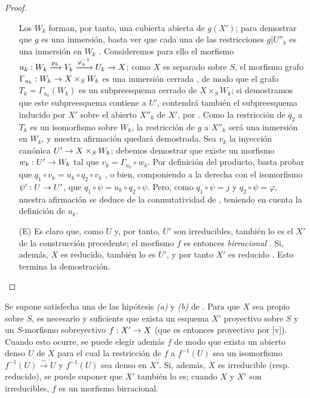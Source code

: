 \documentclass[oneside,10pt]{amsart}
\makeatletter
\newcommand{\ega@arrow}[2]{\mathchoice{#1}{#2}{#2}{#2}}
\renewcommand{\to}{\ega@arrow{\longrightarrow}{\rightarrow}}
\newcommand{\oldpage}[2][]{\marginnote{\normalfont\footnotesize\textbf{#1}~|~#2}\ignorespaces}
\let\EGAOriginalLabel\label
\renewcommand{\label}[1]{\phantomsection\EGAOriginalLabel{#1}}
\makeatother
\begin{document}
\begin{proof}
\begin{enumerate}
    Los $W_k$ forman, por tanto, una cubierta abierta de $g(X')$; para demostrar que $g$ es una inmersión, basta ver que cada una de las restricciones $g|U''_k$ es una inmersión en $W_k$ .
    Consideremos para ello el morfismo $u_k:W_k\xrightarrow{p_k}V_k\xrightarrow{\varphi_k^{-1}}U_k\to X$; como $X$ es separado sobre $S$, el morfismo grafo $\Gamma_{u_k}:W_k\to X\times_SW_k$ es una inmersión cerrada , de modo que el grafo $T_k=\Gamma_{u_k}(W_k)$ es un subpreesquema cerrado de $X\times_SW_k$;
    si demostramos que este subpreesquema contiene a $U'$, contendrá también el subpreesquema inducido por $X'$ sobre el abierto $X''_k$ de $X'$, por .
    Como la restricción de $q_2$ a $T_k$ es un isomorfismo sobre $W_k$, la restricción de $g$ a $X''_k$ será una inmersión en $W_k$, y nuestra afirmación quedará demostrada.
    Sea $v_k$ la inyección canónica $U'\to X\times_SW_k$; debemos demostrar que existe un morfismo $w_k:U'\to W_k$ tal que $v_k=\Gamma_{u_k}\circ w_k$.
    Por definición del producto, basta probar que $q_1\circ v_k=u_k\circ q_2\circ v_k$ , o bien, componiendo a la derecha
\oldpage[II]{109}
    con el isomorfismo $\psi':U\to U'$, que $q_1\circ\psi=u_k\circ q_2\circ\psi$.
    Pero, como $q_1\circ\psi=j$ y $q_2\circ\psi=\varphi$, nuestra afirmación se deduce de la conmutatividad de , teniendo en cuenta la definición de $u_k$.

  \item[(E)] Es claro que, como $U$ y, por tanto, $U'$ son irreducibles, también lo es el $X'$ de la construcción precedente; el morfismo $f$ es entonces \emph{birracional} .
    Si, además, $X$ es reducido, también lo es $U'$, y por tanto $X'$ es reducido .
    Esto termina la demostración.
\end{enumerate}
\end{proof}

\begin{corollary}[5.6.2]
\label{II.5.6.2-fr}
Se supone satisfecha una de las hipótesis \emph{(a)} y \emph{(b)} de .
Para que $X$ sea propio sobre $S$, es necesario y suficiente que exista un esquema $X'$ proyectivo sobre $S$ y un $S$-morfismo sobreyectivo $f:X'\to X$ (que es entonces proyectivo por [v]).
Cuando esto ocurre, se puede elegir además $f$ de modo que exista un abierto denso $U$ de $X$ para el cual la restricción de $f$ a $f^{-1}(U)$ sea un isomorfismo $f^{-1}(U)\xrightarrow{\sim}U$ y $f^{-1}(U)$ sea denso en $X'$.
Si, además, $X$ es irreducible \textup{(resp.} reducido), se puede suponer que $X'$ también lo es; cuando $X$ y $X'$ son irreducibles, $f$ es un morfismo birracional.
\end{corollary}
\end{document}
